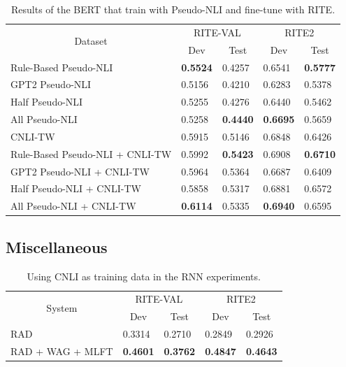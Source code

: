 \documentclass[12pt]{article}
\begin{document}
\begin{CJK*}{UTF8}{bkai}
\begin{spacing}{1.77}
\begin{table}[H]
  \centering
  \setlength{\extrarowheight}{-3pt}
  \caption{Results of the BERT that train with Pseudo-NLI and fine-tune with RITE.}
  \label{result:pseudo_nli_bert}
  \begin{tabular}{|l|l|l|l|l|}
  \hline
  \multicolumn{1}{|c|}{\multirow{2}{*}{Dataset}} & \multicolumn{2}{c|}{RITE-VAL} & \multicolumn{2}{c|}{RITE2} \\ \cline{2-5}
  \multicolumn{1}{|c|}{} & \multicolumn{1}{c|}{Dev} & \multicolumn{1}{c|}{Test} & \multicolumn{1}{c|}{Dev} & \multicolumn{1}{c|}{Test} \\ \hline
  Rule-Based   Pseudo-NLI & \textbf{0.5524} & 0.4257 & 0.6541 & \textbf{0.5777} \\ \hline
  GPT2   Pseudo-NLI & 0.5156 & 0.4210 & 0.6283 & 0.5378 \\ \hline
  Half   Pseudo-NLI & 0.5255 & 0.4276 & 0.6440 & 0.5462 \\ \hline
  All   Pseudo-NLI & 0.5258 & \textbf{0.4440} & \textbf{0.6695} & 0.5659 \\ \hline \hline
  CNLI-TW & 0.5915 & 0.5146 & 0.6848 & 0.6426 \\ \hline
  Rule-Based   Pseudo-NLI + CNLI-TW & 0.5992 & \textbf{0.5423} & 0.6908 & \textbf{0.6710} \\ \hline
  GPT2   Pseudo-NLI + CNLI-TW & 0.5964 & 0.5364 & 0.6687 & 0.6409 \\ \hline
  Half   Pseudo-NLI + CNLI-TW & 0.5858 & 0.5317 & 0.6881 & 0.6572 \\ \hline
  All   Pseudo-NLI + CNLI-TW & \textbf{0.6114} & 0.5335 & \textbf{0.6940} & 0.6595 \\ \hline
  \end{tabular}
\end{table}

\subsection{Miscellaneous}
\begin{table}[H]
  \centering
  \setlength{\extrarowheight}{-3pt}
  \caption{Using CNLI as training data in the RNN experiments.}
  \label{result:rnn_cnli}
  \begin{tabular}{|l|l|l|l|l|}
  \hline
  \multicolumn{1}{|c|}{\multirow{2}{*}{System}} & \multicolumn{2}{c|}{RITE-VAL} & \multicolumn{2}{c|}{RITE2} \\ \cline{2-5}
  \multicolumn{1}{|c|}{} & \multicolumn{1}{c|}{Dev} & \multicolumn{1}{c|}{Test} & \multicolumn{1}{c|}{Dev} & \multicolumn{1}{c|}{Test} \\ \hline
  RAD & 0.3314 & 0.2710 & 0.2849 & 0.2926 \\ \hline
  RAD   + WAG + MLFT & \textbf{0.4601} & \textbf{0.3762} & \textbf{0.4847} & \textbf{0.4643} \\ \hline
  \end{tabular}
\end{table}


\end{spacing}
\end{CJK*}
\end{document}
